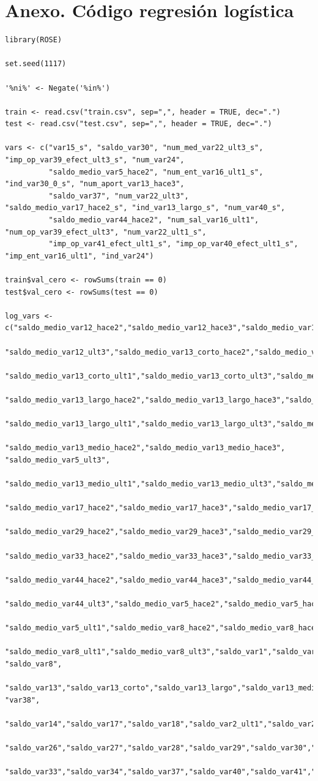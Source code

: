 \documentclass[11pt,a4paper,spanish]{article} %
\begin{document}
\newpage


\appendix

\section{Anexo. Código regresión logística}
{\scriptsize
\begin{verbatim}
library(ROSE)

set.seed(1117)

'%ni%' <- Negate('%in%') 

train <- read.csv("train.csv", sep=",", header = TRUE, dec=".")
test <- read.csv("test.csv", sep=",", header = TRUE, dec=".")

vars <- c("var15_s", "saldo_var30", "num_med_var22_ult3_s", "imp_op_var39_efect_ult3_s", "num_var24",
          "saldo_medio_var5_hace2", "num_ent_var16_ult1_s", "ind_var30_0_s", "num_aport_var13_hace3",
          "saldo_var37", "num_var22_ult3", "saldo_medio_var17_hace2_s", "ind_var13_largo_s", "num_var40_s", 
          "saldo_medio_var44_hace2", "num_sal_var16_ult1", "num_op_var39_efect_ult3", "num_var22_ult1_s", 
          "imp_op_var41_efect_ult1_s", "imp_op_var40_efect_ult1_s", "imp_ent_var16_ult1", "ind_var24")

train$val_cero <- rowSums(train == 0)
test$val_cero <- rowSums(test == 0)

log_vars <- c("saldo_medio_var12_hace2","saldo_medio_var12_hace3","saldo_medio_var12_ult1",
              "saldo_medio_var12_ult3","saldo_medio_var13_corto_hace2","saldo_medio_var13_corto_hace3",
              "saldo_medio_var13_corto_ult1","saldo_medio_var13_corto_ult3","saldo_medio_var17_ult3",
              "saldo_medio_var13_largo_hace2","saldo_medio_var13_largo_hace3","saldo_var25",
              "saldo_medio_var13_largo_ult1","saldo_medio_var13_largo_ult3","saldo_medio_var29_ult3",
              "saldo_medio_var13_medio_hace2","saldo_medio_var13_medio_hace3", "saldo_medio_var5_ult3",
              "saldo_medio_var13_medio_ult1","saldo_medio_var13_medio_ult3","saldo_medio_var33_ult3",
              "saldo_medio_var17_hace2","saldo_medio_var17_hace3","saldo_medio_var17_ult1",
              "saldo_medio_var29_hace2","saldo_medio_var29_hace3","saldo_medio_var29_ult1","saldo_var46",
              "saldo_medio_var33_hace2","saldo_medio_var33_hace3","saldo_medio_var33_ult1","saldo_var5",
              "saldo_medio_var44_hace2","saldo_medio_var44_hace3","saldo_medio_var44_ult1","saldo_var6",
              "saldo_medio_var44_ult3","saldo_medio_var5_hace2","saldo_medio_var5_hace3","saldo_var24",
              "saldo_medio_var5_ult1","saldo_medio_var8_hace2","saldo_medio_var8_hace3","saldo_var32",
              "saldo_medio_var8_ult1","saldo_medio_var8_ult3","saldo_var1","saldo_var12", "saldo_var8",
              "saldo_var13","saldo_var13_corto","saldo_var13_largo","saldo_var13_medio", "var38",
              "saldo_var14","saldo_var17","saldo_var18","saldo_var2_ult1","saldo_var20","saldo_var44",
              "saldo_var26","saldo_var27","saldo_var28","saldo_var29","saldo_var30","saldo_var31",  
              "saldo_var33","saldo_var34","saldo_var37","saldo_var40","saldo_var41","saldo_var42") 


\end{verbatim}}
\end{document}
